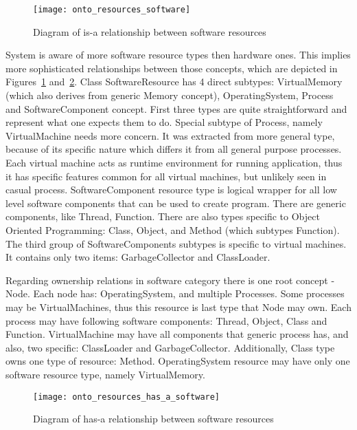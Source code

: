 \begin{figure}[ht]
\centering
\texttt{[image: onto\_resources\_software]}
\caption{Diagram of is-a relationship between software resources}
\label{fig:onto_resources_software}
\end{figure}

System is aware of more software resource types then hardware ones. This implies more sophisticated relationships between those concepts, which are depicted in Figures~\ref{fig:onto_resources_software} and~\ref{fig:onto_resources_has_a_software}. Class SoftwareResource has 4 direct subtypes: VirtualMemory (which also derives from generic Memory concept), OperatingSystem, Process and SoftwareComponent concept. First three types are quite straightforward and represent what one expects them to do. Special subtype of Process, namely VirtualMachine needs more concern. It was extracted from more general type, because of its specific nature which differs it from all general purpose processes. Each virtual machine acts as runtime environment for running application, thus it has specific features common for all virtual machines, but unlikely seen in casual process. SoftwareComponent resource type is logical wrapper for all low level software components that can be used to create program. There are generic components, like Thread, Function. There are also types specific to Object Oriented Programming: Class, Object, and Method (which subtypes Function). The third group of SoftwareComponents subtypes is specific to virtual machines. It contains only two items: GarbageCollector and ClassLoader.

Regarding ownership relations in software category there is one root concept - Node. Each node has: OperatingSystem, and multiple Processes. Some processes may be VirtualMachines, thus this resource is last type that Node may own. Each process may have following software components: Thread, Object, Class and Function. VirtualMachine may have all components that generic process has, and also, two specific: ClassLoader and GarbageCollector. Additionally, Class type owns one type of resource: Method. OperatingSystem resource may have only one software resource type, namely VirtualMemory.

\begin{figure}[ht]
\centering
\texttt{[image: onto\_resources\_has\_a\_software]}
\caption{Diagram of has-a relationship between software resources}
\label{fig:onto_resources_has_a_software}
\end{figure}


